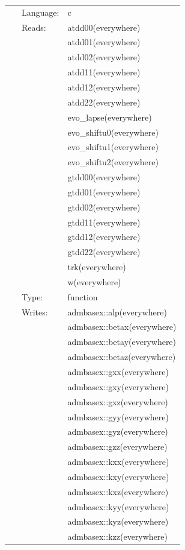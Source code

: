  \begin{tabular*}{160mm}{cll} 
~ & Language:  & c \\ 
~ & Reads:  & atdd00(everywhere) \\ 
~& ~ &atdd01(everywhere)\\ 
~& ~ &atdd02(everywhere)\\ 
~& ~ &atdd11(everywhere)\\ 
~& ~ &atdd12(everywhere)\\ 
~& ~ &atdd22(everywhere)\\ 
~& ~ &evo\_lapse(everywhere)\\ 
~& ~ &evo\_shiftu0(everywhere)\\ 
~& ~ &evo\_shiftu1(everywhere)\\ 
~& ~ &evo\_shiftu2(everywhere)\\ 
~& ~ &gtdd00(everywhere)\\ 
~& ~ &gtdd01(everywhere)\\ 
~& ~ &gtdd02(everywhere)\\ 
~& ~ &gtdd11(everywhere)\\ 
~& ~ &gtdd12(everywhere)\\ 
~& ~ &gtdd22(everywhere)\\ 
~& ~ &trk(everywhere)\\ 
~& ~ &w(everywhere)\\ 
~ & Type:  & function \\ 
~ & Writes:  & admbasex::alp(everywhere) \\ 
~& ~ &admbasex::betax(everywhere)\\ 
~& ~ &admbasex::betay(everywhere)\\ 
~& ~ &admbasex::betaz(everywhere)\\ 
~& ~ &admbasex::gxx(everywhere)\\ 
~& ~ &admbasex::gxy(everywhere)\\ 
~& ~ &admbasex::gxz(everywhere)\\ 
~& ~ &admbasex::gyy(everywhere)\\ 
~& ~ &admbasex::gyz(everywhere)\\ 
~& ~ &admbasex::gzz(everywhere)\\ 
~& ~ &admbasex::kxx(everywhere)\\ 
~& ~ &admbasex::kxy(everywhere)\\ 
~& ~ &admbasex::kxz(everywhere)\\ 
~& ~ &admbasex::kyy(everywhere)\\ 
~& ~ &admbasex::kyz(everywhere)\\ 
~& ~ &admbasex::kzz(everywhere)\\ 
\end{tabular*} 


